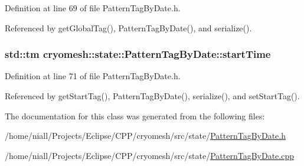 \-Definition at line 69 of file \-Pattern\-Tag\-By\-Date.\-h.



\-Referenced by get\-Global\-Tag(), \-Pattern\-Tag\-By\-Date(), and serialize().

\hypertarget{classcryomesh_1_1state_1_1PatternTagByDate_afe5398940c00ed0fd3b70dcb52efea1c}{
\subsubsection[{start\-Time}]{\setlength{\rightskip}{0pt plus 5cm}std\-::tm {\bf cryomesh\-::state\-::\-Pattern\-Tag\-By\-Date\-::start\-Time}}}\label{classcryomesh_1_1state_1_1PatternTagByDate_afe5398940c00ed0fd3b70dcb52efea1c}


\-Definition at line 71 of file \-Pattern\-Tag\-By\-Date.\-h.



\-Referenced by get\-Start\-Tag(), \-Pattern\-Tag\-By\-Date(), serialize(), and set\-Start\-Tag().



\-The documentation for this class was generated from the following files\-:\begin{DoxyCompactItemize}
\item 
/home/niall/\-Projects/\-Eclipse/\-C\-P\-P/cryomesh/src/state/\hyperlink{PatternTagByDate_8h}{\-Pattern\-Tag\-By\-Date.\-h}\item 
/home/niall/\-Projects/\-Eclipse/\-C\-P\-P/cryomesh/src/state/\hyperlink{PatternTagByDate_8cpp}{\-Pattern\-Tag\-By\-Date.\-cpp}\end{DoxyCompactItemize}
